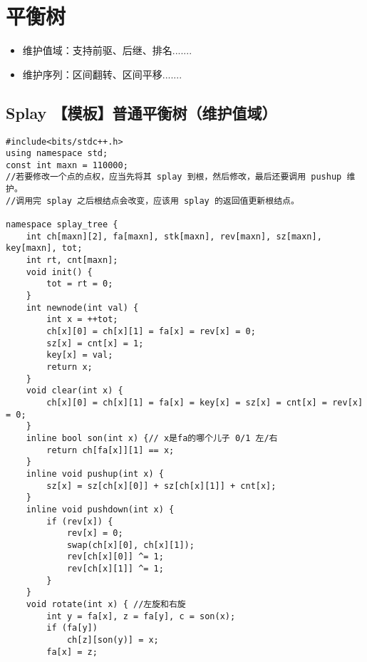 \section{平衡树}

\begin{itemize}
\item 维护值域：支持前驱、后继、排名.......
\item 维护序列：区间翻转、区间平移.......
\end{itemize}
\subsection{Splay 【模板】普通平衡树（维护值域）}
\begin{verbatim}
#include<bits/stdc++.h>
using namespace std;
const int maxn = 110000;
//若要修改一个点的点权，应当先将其 splay 到根，然后修改，最后还要调用 pushup 维护。
//调用完 splay 之后根结点会改变，应该用 splay 的返回值更新根结点。

namespace splay_tree {
    int ch[maxn][2], fa[maxn], stk[maxn], rev[maxn], sz[maxn], key[maxn], tot;
    int rt, cnt[maxn];
    void init() {
        tot = rt = 0;
    }
    int newnode(int val) {
        int x = ++tot;
        ch[x][0] = ch[x][1] = fa[x] = rev[x] = 0;
        sz[x] = cnt[x] = 1;
        key[x] = val;
        return x;
    }
    void clear(int x) {
        ch[x][0] = ch[x][1] = fa[x] = key[x] = sz[x] = cnt[x] = rev[x] = 0;
    }
    inline bool son(int x) {// x是fa的哪个儿子 0/1 左/右
        return ch[fa[x]][1] == x;
    }
    inline void pushup(int x) {
        sz[x] = sz[ch[x][0]] + sz[ch[x][1]] + cnt[x];
    }
    inline void pushdown(int x) {
        if (rev[x]) {
            rev[x] = 0;
            swap(ch[x][0], ch[x][1]);
            rev[ch[x][0]] ^= 1;
            rev[ch[x][1]] ^= 1; 
        }
    }
    void rotate(int x) { //左旋和右旋
        int y = fa[x], z = fa[y], c = son(x);
        if (fa[y])
            ch[z][son(y)] = x;
        fa[x] = z;


\end{verbatim}
